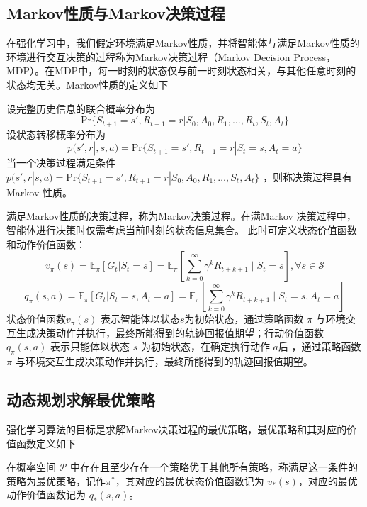\subsection{Markov性质与Markov决策过程}

在强化学习中，我们假定环境满足Markov性质，并将智能体与满足Markov性质的环境进行交互决策的过程称为Markov决策过程（Markov Decision Process，MDP）\cite{white1963dynamic,ross1996stochastic}。在MDP中，每一时刻的状态仅与前一时刻状态相关，与其他任意时刻的状态均无关。Markov性质的定义如下
\begin{definition}
设完整历史信息的联合概率分布为
\begin{equation}
    \mathrm{Pr}\{S_{t+1}=s',R_{t+1}=r|S_0,A_0,R_1,\ldots,R_t,S_t,A_t\}
\end{equation}
设状态转移概率分布为
\begin{equation}
    p(s',r|,s,a) = \mathrm{Pr}\{S_{t+1}=s',R_{t+1}=r|S_t=s,A_t=a\}
\end{equation}
当一个决策过程满足条件$p(s',r|s,a) = \mathrm{Pr}\{S_{t+1}=s',R_{t+1}=r|S_0,A_0,R_1,\ldots,S_t,A_t\}$ ，则称决策过程具有Markov 性质。
\end{definition}

满足Markov性质的决策过程，称为Markov决策过程\cite{sutton2018reinforcement,white1963dynamic}。在满Markov 决策过程中，智能体进行决策时仅需考虑当前时刻的状态信息集合。
此时可定义状态价值函数和动作价值函数：
\begin{equation}
    v_{\pi}(s)=\mathbb{E}_{\pi}\left[G_t|S_t=s\right]=\mathbb{E}_{\pi}\left[\sum_{k=0}^{\infty}\gamma^kR_{t+k+1}\mid S_t=s\right], \forall s \in \mathcal{S}
\end{equation}
\begin{equation}
    q_{\pi}(s,a) =\mathbb{E}_{\pi}\left[G_t|S_t=s,A_t=a\right]=\mathbb{E}_{\pi}\left[\sum_{k=0}^{\infty}\gamma^kR_{t+k+1}\mid S_t=s,A_t=a\right]
\end{equation}
状态价值函数$v_\pi(s)$ 表示智能体以状态$s$为初始状态，通过策略函数 $\pi$ 与环境交互生成决策动作并执行，最终所能得到的轨迹回报值期望；行动价值函数 $q_\pi(s,a)$ 表示只能体以状态 $s$ 为初始状态，在确定执行动作 $a$后 ，通过策略函数 $\pi$ 与环境交互生成决策动作并执行，最终所能得到的轨迹回报值期望。

\subsection{动态规划求解最优策略}

强化学习算法的目标是求解Markov决策过程的最优策略，最优策略和其对应的价值函数定义如下
\begin{definition}
    在概率空间 $\mathcal{P}$ 中存在且至少存在一个策略优于其他所有策略，称满足这一条件的策略为最优策略，记作$\pi^*$，其对应的最优状态价值函数记为 $v_*(s)$，对应的最优动作价值函数记为 $q_*(s,a)$。
\end{definition}

